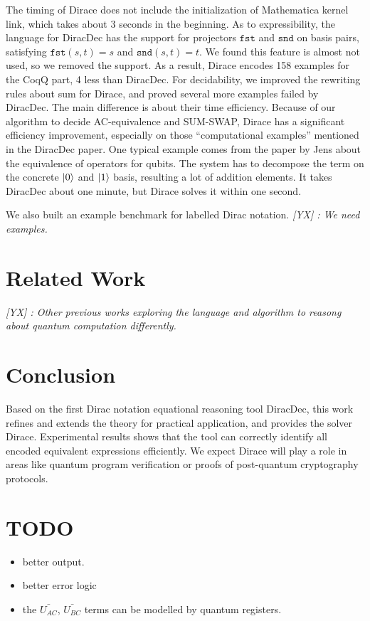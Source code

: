\documentclass[runningheads]{llncs}
\newcommand{\yx}[1]{\textit{\color{blue}[YX] : #1}}
\begin{document}
The timing of Dirace does not include the initialization of Mathematica kernel link, which takes about 3 seconds in the beginning.
As to expressibility, the language for DiracDec has the support for projectors $\texttt{fst}$ and $\texttt{snd}$ on basis pairs, satisfying $\texttt{fst} (s, t) = s$ and $\texttt{snd} (s, t) = t$. We found this feature is almost not used, so we removed the support. As a result, Dirace encodes 158 examples for the CoqQ part, 4 less than DiracDec. For decidability, we improved the rewriting rules about sum for Dirace, and proved several more examples failed by DiracDec. 
The main difference is about their time efficiency. Because of our algorithm to decide AC-equivalence and SUM-SWAP, Dirace has a significant efficiency improvement, especially on those ``computational examples'' mentioned in the DiracDec paper.
One typical example comes from the paper by Jens about the equivalence of operators for qubits. The system has to decompose the term on the concrete $\ket{0}$ and $\ket{1}$ basis, resulting a lot of addition elements. It takes DiracDec about one minute, but Dirace solves it within one second.



We also built an example benchmark for labelled Dirac notation.
\yx{We need examples.}


\section{Related Work}

\yx{Other previous works exploring the language and algorithm to reasong about quantum computation differently.}




\section{Conclusion}
Based on the first Dirac notation equational reasoning tool DiracDec, this work refines and extends the theory for practical application, and provides the solver Dirace. Experimental results shows that the tool can correctly identify all encoded equivalent expressions efficiently. 
We expect Dirace will play a role in areas like quantum program verification or proofs of post-quantum cryptography protocols.


\clearpage


\section{TODO}
\begin{itemize}
    \item better output.
    \item better error logic
    \item the $\bar{U_{AC}}$, $\bar{U_{BC}}$ terms can be modelled by quantum registers.
\end{itemize}
\end{document}
